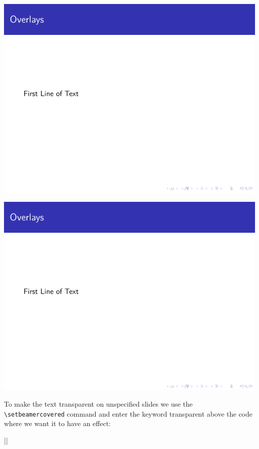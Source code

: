 \begin{column}{0.5\textwidth}
\includegraphics[page=2]{examples/beamer/beameroverlay04.pdf}

\includegraphics[page=3]{examples/beamer/beameroverlay04.pdf}

To make the text transparent on unspecified slides we use the \verb|\setbeamercovered| command and enter the keyword transparent above the code where we want it to have an effect:

||


\end{column}

